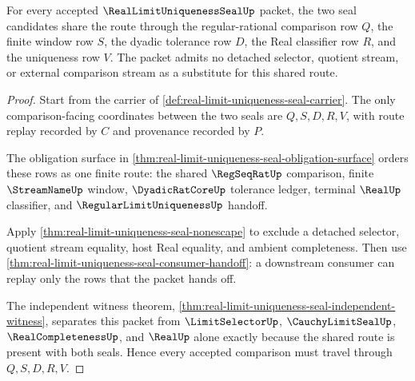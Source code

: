 \begin{theorem}
\label{thm:real-limit-uniqueness-seal-shared-comparison-window}
For every accepted $\RealLimitUniquenessSealUp$ packet, the two seal candidates share the route through the regular-rational comparison row $Q$, the finite window row $S$, the dyadic tolerance row $D$, the Real classifier row $R$, and the uniqueness row $V$. The packet admits no detached selector, quotient stream, or external comparison stream as a substitute for this shared route.
\end{theorem}
\begin{proof}
Start from the carrier of \autoref{def:real-limit-uniqueness-seal-carrier}. The only comparison-facing coordinates between the two seals are $Q,S,D,R,V$, with route replay recorded by $C$ and provenance recorded by $P$.

The obligation surface in \autoref{thm:real-limit-uniqueness-seal-obligation-surface} orders these rows as one finite route: the shared $\RegSeqRatUp$ comparison, finite $\StreamNameUp$ window, $\DyadicRatCoreUp$ tolerance ledger, terminal $\RealUp$ classifier, and $\RegularLimitUniquenessUp$ handoff.

Apply \autoref{thm:real-limit-uniqueness-seal-nonescape} to exclude a detached selector, quotient stream equality, host Real equality, and ambient completeness. Then use \autoref{thm:real-limit-uniqueness-seal-consumer-handoff}: a downstream consumer can replay only the rows that the packet hands off.

The independent witness theorem, \autoref{thm:real-limit-uniqueness-seal-independent-witness}, separates this packet from $\LimitSelectorUp$, $\CauchyLimitSealUp$, $\RealCompletenessUp$, and $\RealUp$ alone exactly because the shared route is present with both seals. Hence every accepted comparison must travel through $Q,S,D,R,V$.
\end{proof}

